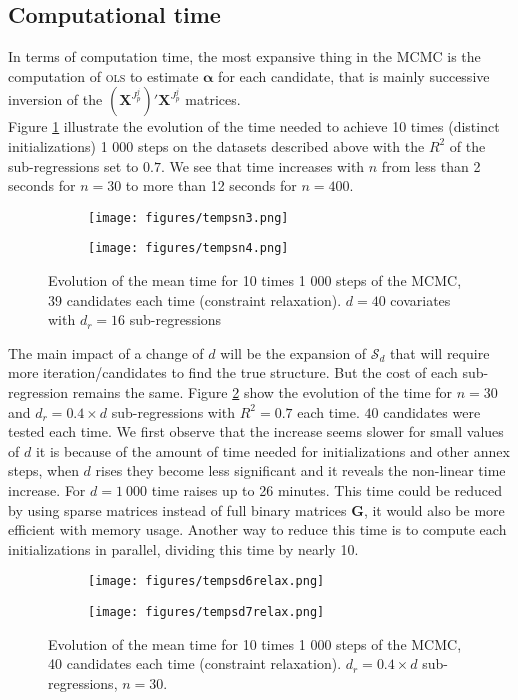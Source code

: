 \documentclass[12pt,a4paper]{report}
\begin{document}
\subsection{Computational time}
	In terms of computation time, the most expansive thing in the MCMC is the computation of \textsc{ols} to estimate $\boldsymbol{\alpha}$ for each candidate, that is mainly successive inversion of the $(\boldsymbol{X}^{J_p^j})'\boldsymbol{X}^{J_p^j}$ matrices. \\
	Figure \ref{tempsn} illustrate the evolution of the time needed to achieve 10 times (distinct initializations) 1 000 steps on the datasets described above with the $R^2$ of the sub-regressions set to $0.7$. We see that time increases with $n$ from less than 2 seconds for $n=30$ to more than 12 seconds for $n=400$.\\	
\begin{figure}[h]
\centering
	\begin{subfigure}
	\centering
		\texttt{[image: figures/tempsn3.png]} 
	\end{subfigure}
	\begin{subfigure}
	\centering
		\texttt{[image: figures/tempsn4.png]} 
	\end{subfigure}
	\caption{Evolution of the mean time for 10 times 1 000 steps of the MCMC, 39 candidates each time (constraint relaxation). $d=40$ covariates with $d_r=16$ sub-regressions}\label{tempsn}
\end{figure}
The main impact of a change of $d$ will be the expansion of $\mathcal{S}_d$ that will require more iteration/candidates to find the true structure. But the cost of each sub-regression remains the same. Figure \ref{tempsdrelax} show the evolution of the time for $n=30$ and $d_r=0.4\times d$ sub-regressions with $R^2=0.7$ each time. $40$ candidates were tested each time.
We first observe that the increase seems slower for small values of $d$ it is because of the amount of time needed for initializations and other annex steps, when $d$ rises they become less significant and it reveals the non-linear time increase. 
For $d=1\ 000$ time raises up to 26 minutes. This time could be reduced by using sparse matrices instead of full binary matrices $\boldsymbol{G}$, it would also be more efficient with memory usage. Another way to reduce this time is to compute each initializations in parallel, dividing this time by nearly 10.
 \\
\begin{figure}[h]
\centering
	\begin{subfigure}
	\centering
		\texttt{[image: figures/tempsd6relax.png]} 
	\end{subfigure}
	\begin{subfigure}
	\centering
		\texttt{[image: figures/tempsd7relax.png]} 
	\end{subfigure}
	\caption{Evolution of the mean time for 10 times 1 000 steps of the MCMC, 40 candidates each time (constraint relaxation). $d_r=0.4\times d$ sub-regressions, $n=30$.}\label{tempsdrelax}
\end{figure}
 
\end{document}
